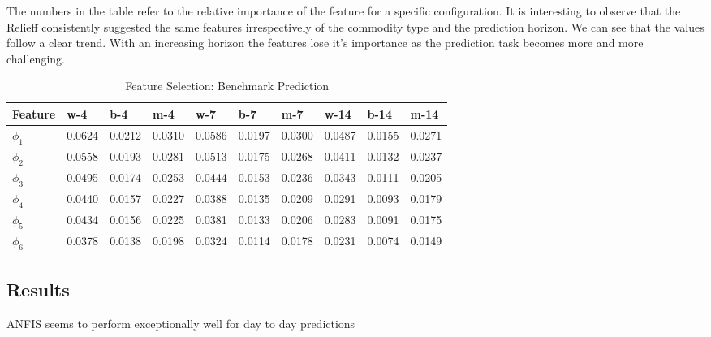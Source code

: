 The numbers in the table refer to the relative importance of the feature for a specific configuration. It is interesting to observe that the Relieff consistently suggested the same features irrespectively of the commodity type and the prediction horizon. We can see that the values follow a clear trend. With an increasing horizon the features lose it's importance as the prediction task becomes more and more challenging. 


\begin{table}[H]
\centering
\begin{tabular}{ |p{2cm}|p{1cm}|p{1cm}|p{1cm}|p{1cm}|p{1cm}|p{1cm}|p{1cm}|p{1cm}|p{1cm}| }
  \hline
 Feature & w-4 & b-4 & m-4 & w-7 & b-7 & m-7 & w-14 & b-14 & m-14   \\
 \hline

 $\phi_1$ & 0.0624   & 0.0212   & 0.0310 &  0.0586  & 0.0197 & 0.0300 & 0.0487 & 0.0155 & 0.0271\\
  \hline
  $\phi_2$ & 0.0558 & 0.0193 & 0.0281 & 0.0513 & 0.0175 & 0.0268 & 0.0411 & 0.0132 & 0.0237 \\
  \hline
  $\phi_3$ & 0.0495 & 0.0174 & 0.0253 & 0.0444 & 0.0153 & 0.0236 & 0.0343 & 0.0111 & 0.0205 \\
  \hline 
  $\phi_4$ & 0.0440 & 0.0157 & 0.0227 & 0.0388 & 0.0135 & 0.0209 & 0.0291 & 0.0093 & 0.0179 \\
  \hline 
  $\phi_5$ & 0.0434 & 0.0156 & 0.0225 & 0.0381 & 0.0133 & 0.0206 & 0.0283 & 0.0091 & 0.0175 \\
  \hline
  $\phi_6$ & 0.0378 & 0.0138 & 0.0198 & 0.0324 & 0.0114 & 0.0178 & 0.0231 & 0.0074 & 0.0149 \\
  \hline
 \end{tabular}
\caption{Feature Selection: Benchmark Prediction}
\label{tab:abc}
\end{table}



\subsection{Results}

ANFIS seems to perform exceptionally well for day to day predictions




